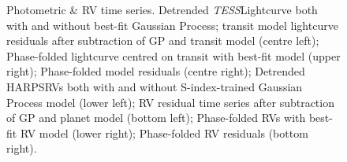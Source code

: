 \documentclass[fleqn,usenatbib]{mnras}
\newcommand{\tess}{{\it TESS}}
\newcommand{\harps}{{HARPS}}
\newcommand{\kms}{km\,s$^{-1}$}
\newcommand{\mss}{\mbox{m\,s$^{-2}$}}
\newcommand{\mstar}{\mbox{$M_{\star}$}}
\newcommand{\rstar}{\mbox{$R_{\star}$}}
\newcommand{\msun}{\mbox{$M_{\odot}$}}
\newcommand{\rsun}{\mbox{$R_{\odot}$}}
\newcommand{\vsini}{$v\sin{i}$}
\newcommand{\teff}{$T_{\rm eff}$}
\newcommand{\feh}{\mbox{$\rm [Fe/H]$}}
\newcommand{\Tlogg}{ $ 4.46 \pm 0.02 $ }
\newcommand{\TFeH}{ $ 0.14 \pm 0.02 $ }
\newcommand{\TMs}{ $ 0.997 \pm 0.01 $ }
\newcommand{\TRs}{ $ 1.032 \pm 0.026 $ }
\begin{document}

\begin{figure}
\caption{Photometric \& RV time series.
Detrended \tess Lightcurve both with and without best-fit Gaussian Process; transit model lightcurve residuals after subtraction of GP and transit model (centre left);
Phase-folded lightcurve centred on transit with best-fit model (upper right); Phase-folded model residuals (centre right);
Detrended \harps RVs both with and without S-index-trained Gaussian Process model (lower left); 
RV residual time series after subtraction of GP and planet model (bottom left);
Phase-folded RVs with best-fit RV model (lower right); Phase-folded RV residuals (bottom right).
}
\label{FullTransitFits0}
\end{figure}
\end{document}
